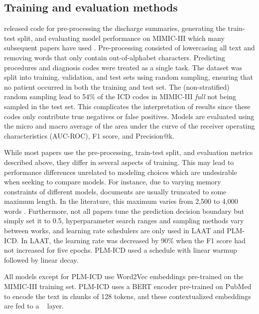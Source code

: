 {\subsection{Training and evaluation methods}\label{sec: training and evaluation methods}

\citet{mullenbachExplainablePredictionMedical2018} released code for pre-processing the discharge summaries, generating the train-test split, and evaluating model performance on MIMIC-III which many subsequent papers have used \cite{vuLabelAttentionModel2020, huangPLMICDAutomaticICD2022, liICDCodingClinical2020, baoMedicalCodePrediction2021, yuanCodeSynonymsMatter2022, kimReadAttendCode2021}.
Pre-processing consisted of lowercasing all text and removing words that only contain out-of-alphabet characters. Predicting procedures and diagnosis codes were treated as a single task.
The dataset was split into training, validation, and test sets using random sampling, ensuring that no patient occurred in both the training and test set. The (non-stratified) random sampling lead to 54\% of the ICD codes in MIMIC-III \textit{full} not being sampled in the test set. This complicates the interpretation of results since these codes only contribute true negatives or false positives. 
Models are evaluated using the micro and macro average of the area under the curve of the receiver operating characteristics (AUC-ROC), F1 score, and Precision@k. 

While most papers use the pre-processing, train-test split, and evaluation metrics described above, they differ in several aspects of training. This may lead to performance differences unrelated to modeling choices which are undesirable when seeking to compare models. 
For instance, due to varying memory constraints of different models, documents are usually truncated to some maximum length. In the literature, this maximum varies from 2,500 to 4,000 words \cite{mullenbachExplainablePredictionMedical2018, vuLabelAttentionModel2020, huangPLMICDAutomaticICD2022}.
Furthermore, not all papers tune the prediction decision boundary but simply set it to 0.5,
 hyperparameter search ranges and sampling methods  vary between works, and learning rate schedulers are only used in LAAT and PLM-ICD\cite{mullenbachExplainablePredictionMedical2018, liICDCodingClinical2020}. In LAAT, the learning rate was decreased by 90\% when the F1 score had not increased for five epochs. PLM-ICD used a schedule with linear warmup followed by linear decay. 

All models except for PLM-ICD use Word2Vec embeddings pre-trained on the MIMIC-III training set. PLM-ICD uses a BERT encoder pre-trained on PubMed to encode the text in chunks of 128 tokens, and these contextualized embeddings are fed to a \lalaat~ layer. 

}
